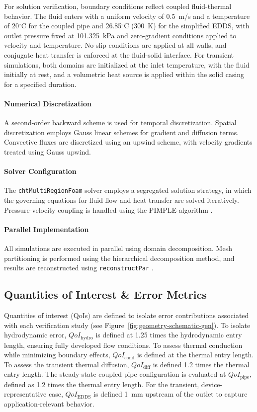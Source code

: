 For solution verification, boundary conditions reflect coupled fluid-thermal behavior. The fluid enters with a uniform velocity of 0.5~m/s and a temperature of 20$^\circ$C for the coupled pipe and 26.85$^\circ$C (300~K) for the simplified EDDS, with outlet pressure fixed at 101.325~kPa and zero-gradient conditions applied to velocity and temperature. No-slip conditions are applied at all walls, and conjugate heat transfer is enforced at the fluid-solid interface. For transient simulations, both domains are initialized at the inlet temperature, with the fluid initially at rest, and a volumetric heat source is applied within the solid casing for a specified duration.

\paragraph{Numerical Discretization}
A second-order backward scheme is used for temporal discretization. Spatial discretization employs Gauss linear schemes for gradient and diffusion terms. Convective fluxes are discretized using an upwind scheme, with velocity gradients treated using Gauss upwind.

\paragraph{Solver Configuration}

The \texttt{chtMultiRegionFoam} solver employs a segregated solution strategy, in which the governing equations for fluid flow and heat transfer are solved iteratively. Pressure-velocity coupling is handled using the PIMPLE algorithm \cite{chtMultiRegion,openfoamSolvers}.

\paragraph{Parallel Implementation}
All simulations are executed in parallel using domain decomposition. Mesh partitioning is performed using the hierarchical decomposition method, and results are reconstructed using \texttt{reconstructPar} \cite{openfoam_simplegeomdecomp,openfoam_multileveldecomp,openfoam_reconstruct}.

\subsection{Quantities of Interest \& Error Metrics}
Quantities of interest (QoIs) are defined to isolate error contributions associated with each verification study (see Figure~\ref{fig:geometry-schematic-gen}). To isolate hydrodynamic error, $QoI_{\text{hydro}}$ is defined at 1.25 times the hydrodynamic entry length, ensuring fully developed flow conditions. To assess thermal conduction while minimizing boundary effects, $QoI_{\text{cond}}$ is defined at the thermal entry length. To assess the transient thermal diffusion, $QoI_{\text{diff}}$ is defined 1.2 times the thermal entry length. The steady-state coupled pipe configuration is evaluated at $QoI_{\text{pipe}}$, defined as 1.2 times the thermal entry length. For the transient, device-representative case, $QoI_{\text{EDDS}}$ is defined 1~mm upstream of the outlet to capture application-relevant behavior.

